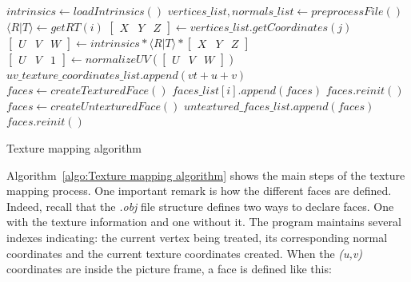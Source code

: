 \begin{algorithm}[H]
  \begin{algorithmic}
    \State $intrinsics \gets loadIntrinsics()$ 
    \State $vertices\_list, normals\_list \gets preprocessFile()$ 
      \State $\langle R\vert T\rangle \gets getRT(i)$ 
        \State $\left[ \begin{smallmatrix} X & Y & Z \end{smallmatrix} \right] \gets vertices\_list.getCoordinates(j)$ 
        \State $\left[ \begin{smallmatrix} U & V & W \end{smallmatrix} \right] \gets intrinsics * \langle R\vert T\rangle * \left[ \begin{smallmatrix} X & Y & Z \end{smallmatrix} \right] $ 
        \State $\left[ \begin{smallmatrix} U & V & 1 \end{smallmatrix} \right] \gets normalizeUV(\left[ \begin{smallmatrix} U & V & W \end{smallmatrix} \right])$
          \State $uv\_texture\_coordinates\_list.append(vt  + u  + v)$
          \State $faces \gets createTexturedFace()$ 
            \State $faces\_list[i].append(faces)$
            \State $faces.reinit()$
          \EndIf
        \Else 
          \State $faces \gets createUntexturedFace()$
            \State $untextured\_faces\_list.append(faces)$
            \State $faces.reinit()$
          \EndIf
        \EndIf
      \EndFor   
    \EndFor 
  \caption{Texture mapping algorithm}
  \label{algo:Texture mapping algorithm}
  \end{algorithmic}
\end{algorithm}

Algorithm~\ref{algo:Texture mapping algorithm} shows the main steps of the texture mapping process. One important remark is how the different faces are defined. Indeed, recall that the \textit{.obj} file structure defines two ways to declare faces. One with the texture information and one without it. The program maintains several indexes indicating: the current vertex being treated, its corresponding normal coordinates and the current texture coordinates created. When the \textit{(u,v)} coordinates are inside the picture frame, a face is defined like this:\\


